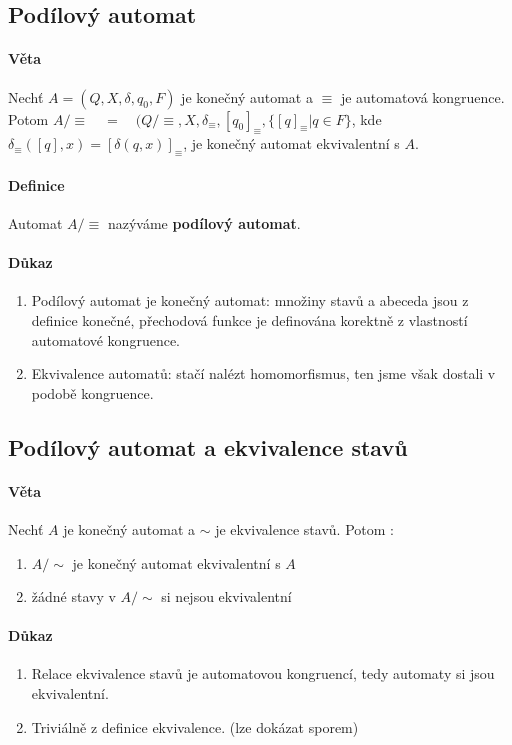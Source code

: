 \documentclass[a4paper,12pt,titlepage]{article}
\begin{document}
\subsection{Podílový automat}
\setcounter{equation}{0}
\paragraph{Věta}
Nechť $A = (Q, X, \delta, q_0, F)$ je konečný automat a $\equiv$ je automatová
kongruence. Potom $A/\equiv \quad=\quad (Q/\equiv, X, \delta_\equiv, [q_0]_\equiv, \{
[q]_\equiv | q \in F\}$, kde $\delta_\equiv([q], x) = [\delta(q,x)]_\equiv$, je
konečný automat ekvivalentní s $A$. 
\paragraph{Definice}
Automat $A/\equiv$ nazýváme \textbf{podílový automat}.
\paragraph{Důkaz}
\begin{enumerate}
	\item Podílový automat je konečný automat: množiny stavů a abeceda jsou z
	definice konečné, přechodová funkce je definována korektně z vlastností
	automatové kongruence.
	\item Ekvivalence automatů: stačí nalézt homomorfismus, ten jsme však
	dostali v podobě kongruence.
\end{enumerate}
\subsection{Podílový automat a ekvivalence stavů}
\setcounter{equation}{0}
\paragraph{Věta}
Nechť $A$ je konečný automat a $\sim$ je ekvivalence stavů.
Potom :
\begin{enumerate}
	\item $A/\sim$ je konečný automat ekvivalentní s $A$
	\item žádné stavy v $A/\sim$ si nejsou ekvivalentní
\end{enumerate}
\paragraph{Důkaz}
\begin{enumerate}
	\item Relace ekvivalence stavů je automatovou kongruencí, tedy automaty si
	jsou ekvivalentní.
	\item Triviálně z definice ekvivalence. (lze dokázat sporem)
\end{enumerate}
\end{document}
